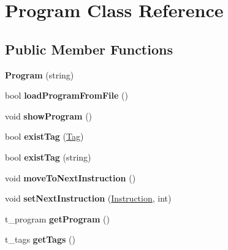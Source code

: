 \hypertarget{classProgram}{\section{Program Class Reference}
\label{classProgram}
}
\subsection*{Public Member Functions}
\begin{DoxyCompactItemize}
\item 
\hypertarget{classProgram_af6ada385f5b85e9b05d4ca77b1c662e2}{{\bfseries Program} (string)}\label{classProgram_af6ada385f5b85e9b05d4ca77b1c662e2}

\item 
\hypertarget{classProgram_abf7fd11e802491c2f4c30a907cdd04b1}{bool {\bfseries load\-Program\-From\-File} ()}\label{classProgram_abf7fd11e802491c2f4c30a907cdd04b1}

\item 
\hypertarget{classProgram_a8856fb9ed6c88db42b690ab0f80f2eaf}{void {\bfseries show\-Program} ()}\label{classProgram_a8856fb9ed6c88db42b690ab0f80f2eaf}

\item 
\hypertarget{classProgram_ab055b0a34e04fa8bd459e5d6ab4e124a}{bool {\bfseries exist\-Tag} (\hyperlink{classTag}{Tag})}\label{classProgram_ab055b0a34e04fa8bd459e5d6ab4e124a}

\item 
\hypertarget{classProgram_aa4118e50ec51f80f60b392024d192908}{bool {\bfseries exist\-Tag} (string)}\label{classProgram_aa4118e50ec51f80f60b392024d192908}

\item 
\hypertarget{classProgram_ab0dc75a521028081adc9aeb9fb2f2d01}{void {\bfseries move\-To\-Next\-Instruction} ()}\label{classProgram_ab0dc75a521028081adc9aeb9fb2f2d01}

\item 
\hypertarget{classProgram_a5f00f8b1075c97456d2b1d3c30fad7f3}{void {\bfseries set\-Next\-Instruction} (\hyperlink{classInstruction}{Instruction}, int)}\label{classProgram_a5f00f8b1075c97456d2b1d3c30fad7f3}

\item 
\hypertarget{classProgram_a0198da3741cd6bfe090d10f39f437924}{t\-\_\-program {\bfseries get\-Program} ()}\label{classProgram_a0198da3741cd6bfe090d10f39f437924}

\item 
\hypertarget{classProgram_a7814e3bdc4d91b57205109b964a51cbd}{t\-\_\-tags {\bfseries get\-Tags} ()}\label{classProgram_a7814e3bdc4d91b57205109b964a51cbd}


\end{DoxyCompactItemize}
